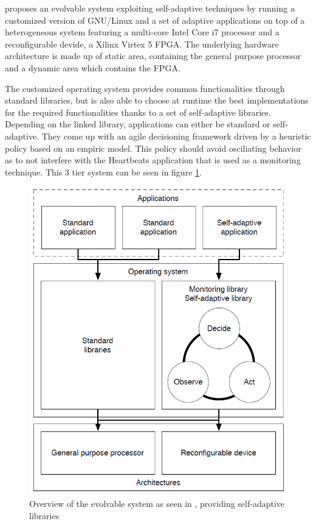 
\cite{evolvable} proposes an evolvable system exploiting self-adaptive techniques by running a customized version of GNU/Linux and a set of adaptive applications on top of a heterogeneous system featuring a multi-core Intel Core i7 processor and a reconfigurable devide, a Xilinx Virtex 5 FPGA. The underlying hardware architecture is made up of static area, containing the general purpose processor and a dynamic area which contains the FPGA. 

The customized operating system provides common functionalities through standard libraries, but is also able to choose at runtime the best implementations for the required functionalities thanks to a set of self-adaptive libraries. Depending on the linked library, applications can either be standard or self-adaptive. They come up with an agile decisioning framework driven by a heuristic policy based on an empiric model. This policy should avoid osciliating behavior as to not interfere with the Heartbeats application that is used as a monitoring technique. This 3 tier system can be seen in figure \ref{fig:tier}.
%
\begin{figure}[htb]%
\includegraphics[width=\columnwidth]{Pictures/3tier.png}%
\caption{Overview of the evolvable system as seen in \cite{evolvable}, providing self-adaptive libraries}%
\label{fig:tier}%
\end{figure}

